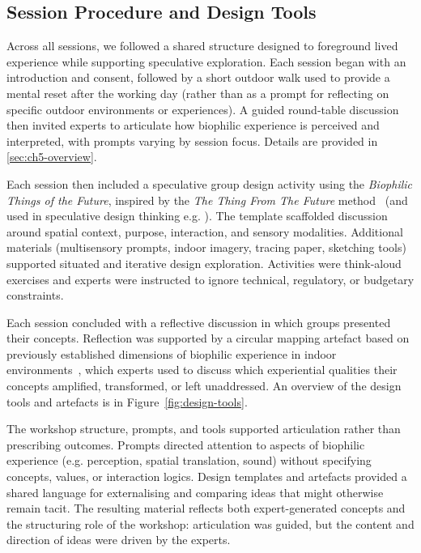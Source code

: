 \subsection{Session Procedure and Design Tools}
\label{subsec:ch5-session-procedure}
Across all sessions, we followed a shared structure designed to foreground lived experience while supporting speculative exploration. Each session began with an introduction and consent, followed by a short outdoor walk used to provide a mental reset after the working day (rather than as a prompt for reflecting on specific outdoor environments or experiences). A guided round-table discussion then invited experts to articulate how biophilic experience is perceived and interpreted, with prompts varying by session focus. Details are provided in \autoref{sec:ch5-overview}.

Each session then included a speculative group design activity using the \emph{Biophilic Things of the Future}, inspired by the \emph{The Thing From The Future} method~\cite{candy2018gaming} (and used in speculative design thinking e.g. \cite{becsevli2024smell, becsevli2025sonarios}). The template scaffolded discussion around spatial context, purpose, interaction, and sensory modalities. Additional materials (multisensory prompts, indoor imagery, tracing paper, sketching tools) supported situated and iterative design exploration. Activities were think-aloud exercises and experts were instructed to ignore technical, regulatory, or budgetary constraints.

Each session concluded with a reflective discussion in which groups presented their concepts. Reflection was supported by a circular mapping artefact based on previously established dimensions of biophilic experience in indoor environments~\cite{rao2025designing}, which experts used to discuss which experiential qualities their concepts amplified, transformed, or left unaddressed. An overview of the design tools and artefacts is in Figure~\ref{fig:design-tools}.

The workshop structure, prompts, and tools supported articulation rather than prescribing outcomes. Prompts directed attention to aspects of biophilic experience (e.g. perception, spatial translation, sound) without specifying concepts, values, or interaction logics. Design templates and artefacts provided a shared language for externalising and comparing ideas that might otherwise remain tacit. The resulting material reflects both expert-generated concepts and the structuring role of the workshop: articulation was guided, but the content and direction of ideas were driven by the experts.


